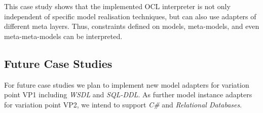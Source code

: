This case study shows that the implemented OCL interpreter is not only independent
of specific model realisation techniques, but can also use adapters of different meta layers.
Thus, constraints defined on models, meta-models, and even meta-meta-models can be interpreted.



\subsection{Future Case Studies}

For future case studies we plan to implement new model adapters for variation point VP1
including \emph{WSDL} and \emph{SQL-DDL}. As further model instance adapters for variation
point VP2, we intend to support \emph{C\#} and \emph{Relational Databases}.

